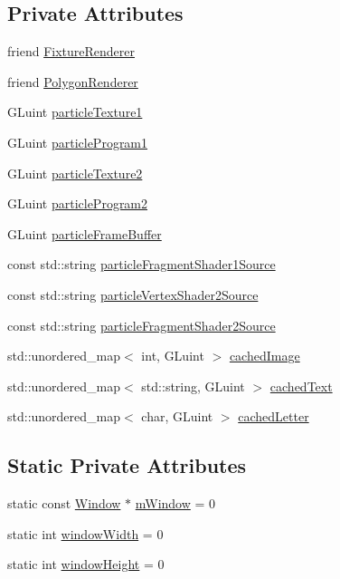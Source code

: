 \subsection*{Private Attributes}
\begin{DoxyCompactItemize}
\item 
friend \hyperlink{classRender_a5d7f62cb07edbd2d40faf2d8b00c7247}{Fixture\+Renderer}
\item 
friend \hyperlink{classRender_a71b1d6988fe8a9ab6c0c664216f327fe}{Polygon\+Renderer}
\item 
G\+Luint \hyperlink{classRender_a06b269a30c844daeae9af44ab9157dbe}{particle\+Texture1}
\item 
G\+Luint \hyperlink{classRender_a7bf04c329740a17f06ee75b0ecd5aa39}{particle\+Program1}
\item 
G\+Luint \hyperlink{classRender_a2b70f4712c191f832e237e6481d537e8}{particle\+Texture2}
\item 
G\+Luint \hyperlink{classRender_ad8abc021db462a304ffbf43af03b8de6}{particle\+Program2}
\item 
G\+Luint \hyperlink{classRender_a0d697ea0a45a8948778fcc70d3a86070}{particle\+Frame\+Buffer}
\item 
const std\+::string \hyperlink{classRender_ada528ae821ea616fd860dae0e3410f64}{particle\+Fragment\+Shader1\+Source}
\item 
const std\+::string \hyperlink{classRender_a5f2e3ef7086c66483e5711d2b130042b}{particle\+Vertex\+Shader2\+Source}
\item 
const std\+::string \hyperlink{classRender_af249c6ab18c7af2bf8342333a8fb49e3}{particle\+Fragment\+Shader2\+Source}
\item 
std\+::unordered\+\_\+map$<$ int, G\+Luint $>$ \hyperlink{classRender_a263985bafcb2d6c0ce779e91d2477153}{cached\+Image}
\item 
std\+::unordered\+\_\+map$<$ std\+::string, G\+Luint $>$ \hyperlink{classRender_adff0dcf9dc188c9ae16e037232f5eefb}{cached\+Text}
\item 
std\+::unordered\+\_\+map$<$ char, G\+Luint $>$ \hyperlink{classRender_aa6d94314989f71664768b49c7d211d1f}{cached\+Letter}
\end{DoxyCompactItemize}
\subsection*{Static Private Attributes}
\begin{DoxyCompactItemize}
\item 
static const \hyperlink{classWindow}{Window} $\ast$ \hyperlink{classRender_a6ad72a846871260c4da9e5aa9e337944}{m\+Window} = 0
\item 
static int \hyperlink{classRender_a4f5a1e0ff84b8e48c6dcb1409926110a}{window\+Width} = 0
\item 
static int \hyperlink{classRender_a0d4491ee8fe250d915a93019e2575350}{window\+Height} = 0
\end{DoxyCompactItemize}


